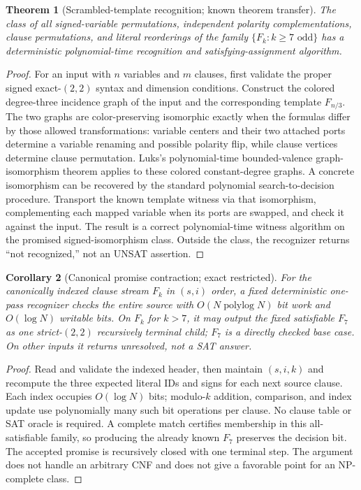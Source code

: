 \documentclass[11pt]{article}
\newtheorem{theorem}{Theorem}
\newtheorem{corollary}[theorem]{Corollary}
\begin{document}
\begin{theorem}[Scrambled-template recognition; known theorem transfer]
The class of all signed-variable permutations, independent polarity
complementations, clause permutations, and literal reorderings of the
family $\{F_k:k\ge7\text{ odd}\}$ has a deterministic polynomial-time
recognition and satisfying-assignment algorithm.
\end{theorem}
\begin{proof}
For an input with $n$ variables and $m$ clauses, first validate the
proper signed exact-$(2,2)$ syntax and dimension conditions. Construct
the colored degree-three incidence graph of the input and the corresponding
template $F_{n/3}$. The two graphs are color-preserving isomorphic exactly
when the formulas differ by those allowed transformations: variable centers
and their two attached ports determine a variable renaming and possible
polarity flip, while clause vertices determine clause permutation.
Luks's polynomial-time bounded-valence graph-isomorphism theorem applies
to these colored constant-degree graphs\cite{luks}. A concrete isomorphism
can be recovered by the standard polynomial search-to-decision procedure.
Transport the known template witness via that isomorphism, complementing
each mapped variable when its ports are swapped, and check it against the
input. The result is a correct polynomial-time witness algorithm on the
promised signed-isomorphism class. Outside the class, the recognizer returns
``not recognized,'' not an UNSAT assertion.
\end{proof}

\begin{corollary}[Canonical promise contraction; exact restricted]\label{cor:canonical}
For the canonically indexed clause stream $F_k$ in $(s,i)$ order, a fixed
deterministic one-pass recognizer checks the entire source with
$O(N\operatorname{polylog}N)$ bit work and $O(\log N)$ writable bits.
On $F_k$ for $k>7$, it may output the fixed satisfiable $F_7$ as one
strict-$(2,2)$ recursively terminal child; $F_7$ is a directly checked
base case. On other inputs it returns \emph{unresolved}, not a SAT answer.
\end{corollary}
\begin{proof}
Read and validate the indexed header, then maintain $(s,i,k)$ and
recompute the three expected literal IDs and signs for each next source
clause. Each index occupies $O(\log N)$ bits; modulo-$k$ addition, comparison,
and index update use polynomially many such bit operations per clause.
No clause table or SAT oracle is required. A complete match certifies
membership in this all-satisfiable family, so producing the already known
$F_7$ preserves the decision bit. The accepted promise is recursively
closed with one terminal step. The argument does not handle an arbitrary
CNF and does not give a favorable point for an NP-complete class.
\end{proof}
\end{document}
